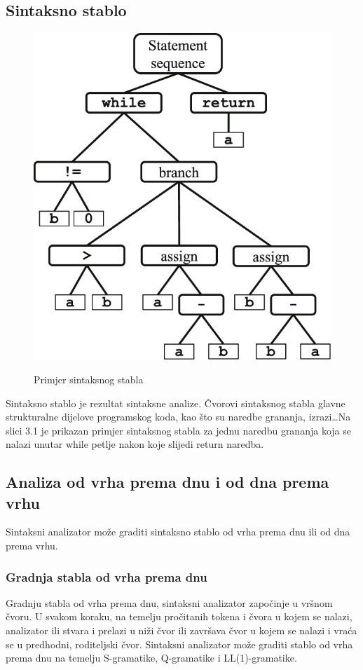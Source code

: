 \documentclass[times, utf8, zavrsni]{fer}
\begin{document}
\subsection{Sintaksno stablo}
\begin{figure}
    \includegraphics[scale=0.5]{800px-Abstract_syntax_tree_for_Euclidean_algorithm.svg.png}\\
    \caption{Primjer sintaksnog stabla \cite{slika}}
\end{figure}

Sintaksno stablo je rezultat sintaksne analize. Čvorovi sintaksnog stabla glavne strukturalne dijelove programskog koda, kao što su naredbe grananja,
izrazi\dots Na slici 3.1 je prikazan primjer sintaksnog stabla za jednu naredbu grananja koja se nalazi unutar while petlje nakon koje slijedi return naredba.

\subsection{Analiza od vrha prema dnu i od dna prema vrhu}
Sintaksni analizator može graditi sintaksno stablo od vrha prema dnu ili od dna prema vrhu.

\subsubsection{Gradnja stabla od vrha prema dnu}
Gradnju stabla od vrha prema dnu, sintaksni analizator započinje u vršnom čvoru. U svakom koraku, na temelju 
pročitanih tokena i čvora u kojem se nalazi, analizator ili stvara i prelazi u niži čvor ili završava čvor u kojem se nalazi
i vraća se u predhodni, roditeljski čvor. Sintaksni analizator može graditi stablo od vrha prema dnu na temelju S-gramatike,
Q-gramatike i LL(1)-gramatike. \cite{ppj}
\end{document}
